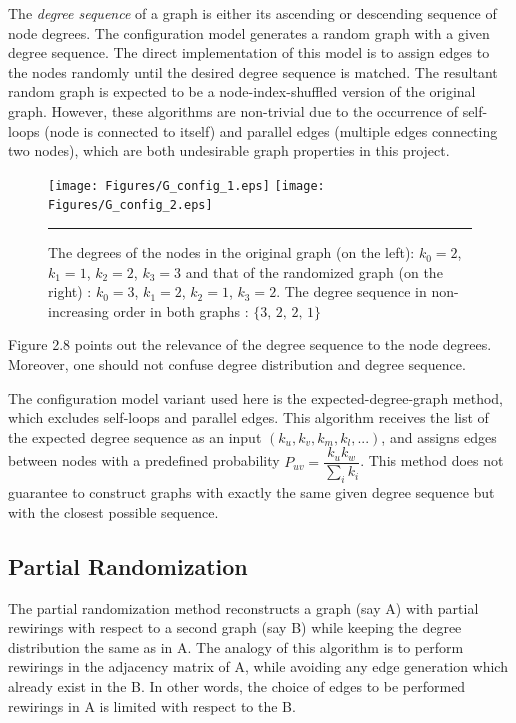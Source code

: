 The \textit{degree sequence} of a graph is either its ascending or descending sequence of node degrees. The configuration model generates a random graph with a given degree sequence. The direct implementation of this model is to assign edges to the nodes randomly until the desired degree sequence is matched. The resultant random graph is expected to be a node-index-shuffled version of the original graph. However, these algorithms are non-trivial due to the occurrence of self-loops (node is connected to itself) and parallel edges (multiple edges connecting two nodes), which are both undesirable graph properties in this project. 

\begin{figure}[htbp]
  \centering
	\texttt{[image: Figures/G\_config\_1.eps]}  
	\texttt{[image: Figures/G\_config\_2.eps]} 
    \rule{35em}{0.5pt}
    \caption[Degree Sequence Definition]{The degrees of the nodes in the original graph (on the left): $k_0 = 2$, $k_1 =1$, $k_2=2$, $k_3=3$ and that of the randomized graph (on the right) : $k_0 = 3$, $k_1 =2$, $k_2=1$, $k_3=2$. The degree sequence in non-increasing order in both graphs : $\{3,\,2,\,2,\,1\}$}
  \label{fig:Degree Sequence Definition}
\end{figure}

Figure 2.8 points out the relevance of the degree sequence to the node degrees. Moreover, one should not confuse degree distribution and degree sequence.   

The configuration model variant used here is the expected-degree-graph method, which excludes self-loops and parallel edges. This algorithm receives the list of the expected degree sequence as an input $(k_u, k_v, k_m, k_l, ...)$, and assigns edges between nodes with a predefined probability $P_{uv}=\dfrac{k_u k_w}{\sum_{i}k_i}$. This method does not guarantee to construct graphs with exactly the same given degree sequence but with the closest possible sequence.  



 
\subsection{Partial Randomization}
 
The partial randomization method  reconstructs a graph (say A) with partial rewirings with respect to a second graph (say B) while keeping the degree distribution the same as in A. The analogy of this algorithm is to perform rewirings in the adjacency matrix of A, while avoiding any edge generation which already exist in the B. In other words, the choice of edges to be performed rewirings in A is limited with respect to the B. 

